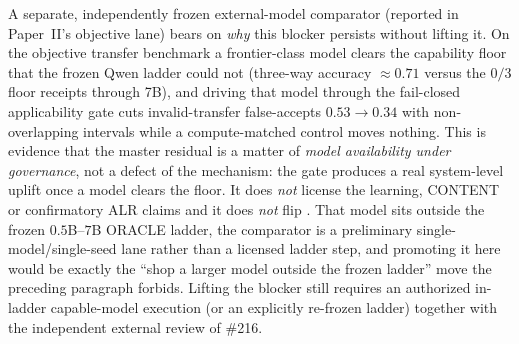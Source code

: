 A separate, independently frozen external-model comparator (reported in Paper~II's objective lane) bears on \emph{why} this blocker persists without lifting it.  On the objective transfer benchmark a frontier-class model clears the capability floor that the frozen Qwen ladder could not (three-way accuracy $\approx0.71$ versus the $0/3$ floor receipts through 7B), and driving that model through the fail-closed applicability gate cuts invalid-transfer false-accepts $0.53\!\to\!0.34$ with non-overlapping intervals while a compute-matched control moves nothing.  This is evidence that the master residual is a matter of \emph{model availability under governance}, not a defect of the mechanism: the gate produces a real system-level uplift once a model clears the floor.  It does \emph{not} license the learning, CONTENT or confirmatory ALR claims and it does \emph{not} flip .  That model sits outside the frozen $0.5$B--$7$B ORACLE ladder, the comparator is a preliminary single-model/single-seed lane rather than a licensed ladder step, and promoting it here would be exactly the ``shop a larger model outside the frozen ladder'' move the preceding paragraph forbids.  Lifting the blocker still requires an authorized in-ladder capable-model execution (or an explicitly re-frozen ladder) together with the independent external review of \#216.
